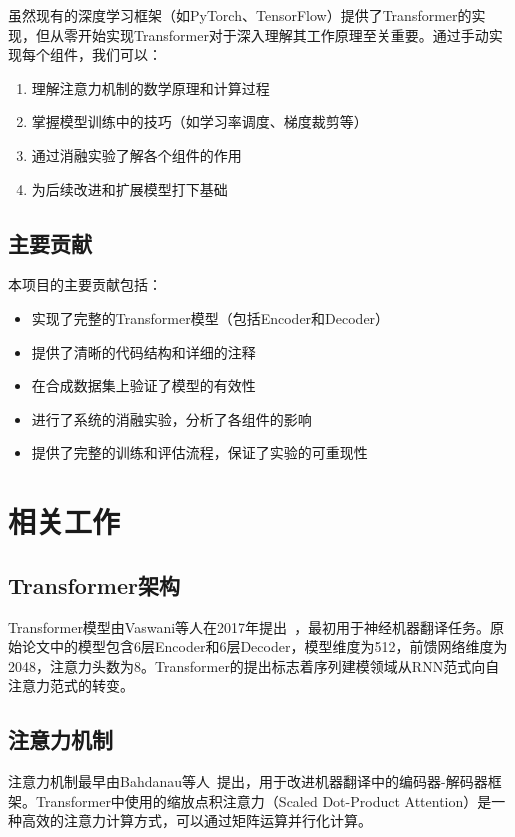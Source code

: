 \documentclass[UTF8,12pt,a4paper]{ctexart}
\begin{document}
虽然现有的深度学习框架（如PyTorch、TensorFlow）提供了Transformer的实现，但从零开始实现Transformer对于深入理解其工作原理至关重要。通过手动实现每个组件，我们可以：

\begin{enumerate}
    \item 理解注意力机制的数学原理和计算过程
    \item 掌握模型训练中的技巧（如学习率调度、梯度裁剪等）
    \item 通过消融实验了解各个组件的作用
    \item 为后续改进和扩展模型打下基础
\end{enumerate}

\subsection{主要贡献}

本项目的主要贡献包括：

\begin{itemize}
    \item 实现了完整的Transformer模型（包括Encoder和Decoder）
    \item 提供了清晰的代码结构和详细的注释
    \item 在合成数据集上验证了模型的有效性
    \item 进行了系统的消融实验，分析了各组件的影响
    \item 提供了完整的训练和评估流程，保证了实验的可重现性
\end{itemize}

\section{相关工作}

\subsection{Transformer架构}

Transformer模型由Vaswani等人在2017年提出~\cite{vaswani2017attention}，最初用于神经机器翻译任务。原始论文中的模型包含6层Encoder和6层Decoder，模型维度为512，前馈网络维度为2048，注意力头数为8。Transformer的提出标志着序列建模领域从RNN范式向自注意力范式的转变。

\subsection{注意力机制}

注意力机制最早由Bahdanau等人~\cite{bahdanau2014neural}提出，用于改进机器翻译中的编码器-解码器框架。Transformer中使用的缩放点积注意力（Scaled Dot-Product Attention）是一种高效的注意力计算方式，可以通过矩阵运算并行化计算。
\end{document}
